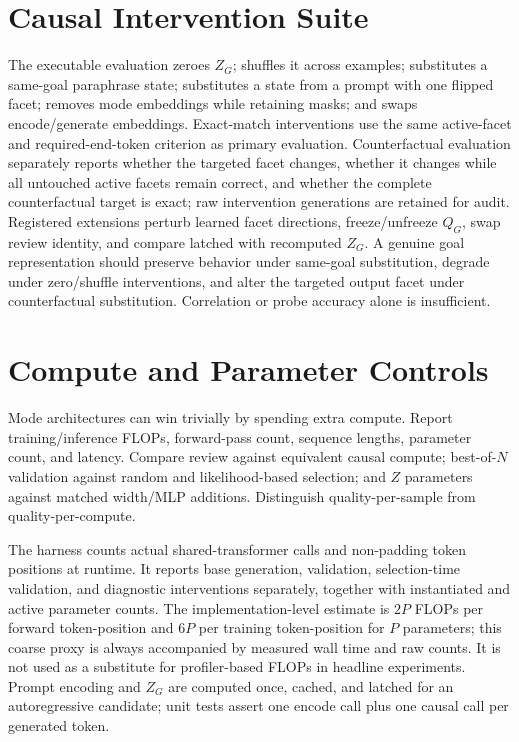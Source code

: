 \documentclass[11pt]{article}
\begin{document}
\section{Causal Intervention Suite}
The executable evaluation zeroes $Z_G$; shuffles it across examples; substitutes a same-goal paraphrase state; substitutes a state from a prompt with one flipped facet; removes mode embeddings while retaining masks; and swaps encode/generate embeddings. Exact-match interventions use the same active-facet and required-end-token criterion as primary evaluation. Counterfactual evaluation separately reports whether the targeted facet changes, whether it changes while all untouched active facets remain correct, and whether the complete counterfactual target is exact; raw intervention generations are retained for audit. Registered extensions perturb learned facet directions, freeze/unfreeze $Q_G$, swap review identity, and compare latched with recomputed $Z_G$. A genuine goal representation should preserve behavior under same-goal substitution, degrade under zero/shuffle interventions, and alter the targeted output facet under counterfactual substitution. Correlation or probe accuracy alone is insufficient.

\section{Compute and Parameter Controls}
Mode architectures can win trivially by spending extra compute. Report training/inference FLOPs, forward-pass count, sequence lengths, parameter count, and latency. Compare review against equivalent causal compute; best-of-$N$ validation against random and likelihood-based selection; and $Z$ parameters against matched width/MLP additions. Distinguish quality-per-sample from quality-per-compute.

The harness counts actual shared-transformer calls and non-padding token positions at runtime. It reports base generation, validation, selection-time validation, and diagnostic interventions separately, together with instantiated and active parameter counts. The implementation-level estimate is $2P$ FLOPs per forward token-position and $6P$ per training token-position for $P$ parameters; this coarse proxy is always accompanied by measured wall time and raw counts. It is not used as a substitute for profiler-based FLOPs in headline experiments. Prompt encoding and $Z_G$ are computed once, cached, and latched for an autoregressive candidate; unit tests assert one encode call plus one causal call per generated token.
\end{document}

